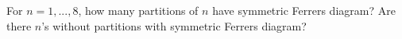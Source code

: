 For $n=1, ..., 8$, how many partitions of $n$ have
symmetric Ferrers diagram?
Are there $n$'s without partitions with symmetric Ferrers diagram?
